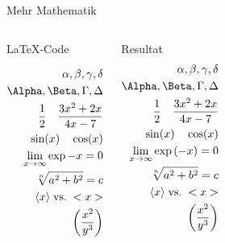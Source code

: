\begin{frame}[fragile]{Mehr Mathematik}
  \begin{columns}[T]
    \begin{block}{\LaTeX-Code}
      \begin{lstverbatim}
      \begin{align*}
        \alpha, \beta, \gamma, \delta \\ 
        \Alpha, \Beta, \Gamma, \Delta \\
        \frac12 \quad \frac{3x^2 + 2x}{4x - 7} \\
        \sin(x) \quad \cos(x) \\
        \lim_{x \to \infty} \exp{-x} = 0 \\
        \sqrt[n]{a^2 + b^2} = c \\
        \langle x \rangle \; \text{vs.} \; < x >  \\
        \left(\frac{x^2}{y^3}\right)
      \end{align*}
      \end{lstverbatim}
    \end{block}
    \begin{block}{Resultat}
      \begin{align*}
        \alpha, \beta, \gamma, \delta \\ 
        \Alpha, \Beta, \Gamma, \Delta \\
        \frac12 \quad \frac{3x^2 + 2x}{4x - 7} \\
        \sin(x) \quad \cos(x) \\
        \lim_{x \to \infty} \exp{(-x)} = 0 \\
        \sqrt[n]{a^2 + b^2} = c \\
        \langle x \rangle \; \text{vs.} \; < x >  \\
        \left(\frac{x^2}{y^3}\right)
      \end{align*}
    \end{block}
  \end{columns}
  
\end{frame}

